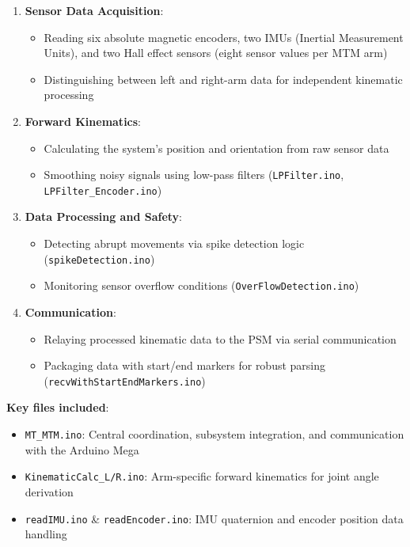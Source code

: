 \begin{enumerate}
    \item \textbf{Sensor Data Acquisition}:
    \begin{itemize}
        \item Reading six absolute magnetic encoders, two IMUs (Inertial Measurement Units), and two Hall effect sensors (eight sensor values per MTM arm)
        \item Distinguishing between left and right-arm data for independent kinematic processing
    \end{itemize}
    
    \item \textbf{Forward Kinematics}:
    \begin{itemize}
        \item Calculating the system's position and orientation from raw sensor data
        \item Smoothing noisy signals using low-pass filters (\texttt{LPFilter.ino}, \texttt{LPFilter\_Encoder.ino})
    \end{itemize}
    
    \item \textbf{Data Processing and Safety}:
    \begin{itemize}
        \item Detecting abrupt movements via spike detection logic (\texttt{spikeDetection.ino})
        \item Monitoring sensor overflow conditions (\texttt{OverFlowDetection.ino})
    \end{itemize}
    
    \item \textbf{Communication}:
    \begin{itemize}
        \item Relaying processed kinematic data to the PSM via serial communication
        \item Packaging data with start/end markers for robust parsing (\texttt{recvWithStartEndMarkers.ino})
    \end{itemize}
\end{enumerate}

\textbf{Key files included}:
\begin{itemize}
    \item \texttt{MT\_MTM.ino}: Central coordination, subsystem integration, and communication with the Arduino Mega
    \item \texttt{KinematicCalc\_L/R.ino}: Arm-specific forward kinematics for joint angle derivation
    \item \texttt{readIMU.ino} \& \texttt{readEncoder.ino}: IMU quaternion and encoder position data handling
\end{itemize}


